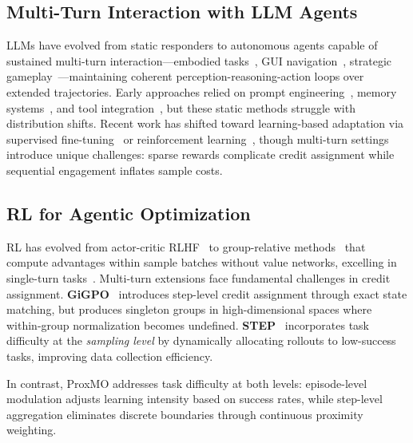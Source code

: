 \documentclass[11pt]{article}
\begin{document}
\subsection{Multi-Turn Interaction with LLM Agents}
LLMs have evolved from static responders to autonomous agents capable of sustained multi-turn interaction—embodied tasks~\cite{shridhar2020alfworld,li2024embodied}, GUI navigation~\cite{furuta2023multimodal,zheng2024gpt,gou2024navigating,feng2025towards}, strategic gameplay~\cite{wang2023voyager,wang2024mobile}—maintaining coherent perception-reasoning-action loops over extended trajectories. Early approaches relied on prompt engineering~\cite{yao2022react,shinn2023reflexion}, memory systems~\cite{wang2024mobile,tan2024cradle}, and tool integration~\cite{schick2023toolformer,xie2024osworld}, but these static methods struggle with distribution shifts. Recent work has shifted toward learning-based adaptation via supervised fine-tuning~\cite{zhang2024you} or reinforcement learning~\cite{sutton1998reinforcement}, though multi-turn settings introduce unique challenges: sparse rewards complicate credit assignment while sequential engagement inflates sample costs.

\subsection{RL for Agentic Optimization}
RL has evolved from actor-critic RLHF~\cite{ziegler2019fine,stiennon2020learning,ouyang2022training,schulman2017proximal} to group-relative methods~\cite{shao2024deepseekmath,kool2019buy,ahmadian2024back,liu2025understanding,yu2025dapo} that compute advantages within sample batches without value networks, excelling in single-turn tasks~\cite{guo2025deepseek,jin2025search,sun2025zerosearch,qian2025toolrl}. Multi-turn extensions face fundamental challenges in credit assignment. \textbf{GiGPO}~\cite{feng2025group} introduces step-level credit assignment through exact state matching, but produces singleton groups in high-dimensional spaces where within-group normalization becomes undefined. \textbf{STEP}~\cite{chen2025step} incorporates task difficulty at the \textit{sampling level} by dynamically allocating rollouts to low-success tasks, improving data collection efficiency.


In contrast, ProxMO addresses task difficulty at both levels: episode-level modulation adjusts learning intensity based on success rates, while step-level aggregation eliminates discrete boundaries through continuous proximity weighting.
\end{document}
